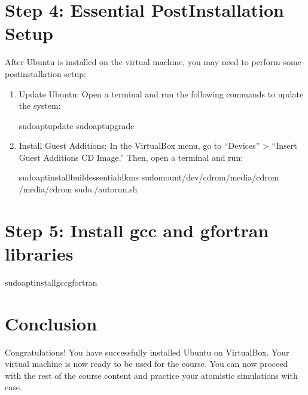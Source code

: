 \documentclass[letterpaper,10pt,english]{sphinxmanual}
\begin{document}
\section{Step 4: Essential Post\sphinxhyphen{}Installation Setup}
\label{\detokenize{vbox/vbox:step-4-essential-post-installation-setup}}
\sphinxAtStartPar
After Ubuntu is installed on the virtual machine, you may need to perform some post\sphinxhyphen{}installation setup:
\begin{enumerate}
%
\item {} 
\sphinxAtStartPar
Update Ubuntu: Open a terminal and run the following commands to update the system:

\begin{sphinxVerbatim}[commandchars=\\\{\}]
sudoaptupdate
sudoaptupgrade
\end{sphinxVerbatim}

\item {} 
\sphinxAtStartPar
Install Guest Additions: In the VirtualBox menu, go to “Devices” \sphinxhyphen{}\textgreater{} “Insert Guest Additions CD Image.” Then, open a terminal and run:

\begin{sphinxVerbatim}[commandchars=\\\{\}]
sudoaptinstallbuild\PYGZhy{}essentialdkms
sudomount/dev/cdrom/media/cdrom
/media/cdrom
sudo./autorun.sh
\end{sphinxVerbatim}

\end{enumerate}


\section{Step 5: Install gcc and gfortran libraries}
\label{\detokenize{vbox/vbox:step-5-install-gcc-and-gfortran-libraries}}
\begin{sphinxVerbatim}[commandchars=\\\{\}]
sudoaptinstallgccgfortran
\end{sphinxVerbatim}


\section{Conclusion}
\label{\detokenize{vbox/vbox:conclusion}}
\sphinxAtStartPar
Congratulations! You have successfully installed Ubuntu on VirtualBox. Your virtual machine is now ready to be used for the course. You can now proceed with the rest of the course content and practice your atomistic simulations with ease.
\end{document}
